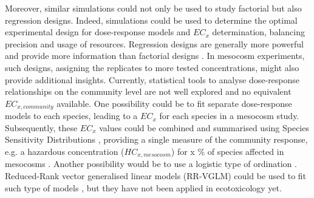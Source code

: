 Moreover, similar simulations could not only be used to study factorial but also regression designs.
Indeed, simulations could be used to determine the optimal experimental design for dose-response models and $EC_x$ determination, balancing precision and usage of resources. 
Regression designs are generally more powerful and provide more information than factorial designs  \citep{cottingham_knowing_2005}. 
In mesocosm experiments, such designs, assigning the replicates to more tested concentrations, might also provide additional insights.
Currently, statistical tools to analyse dose-response relationships on the community level are not well explored and no equivalent $EC_{x, community}$ available.
One possibility could be to fit separate dose-response models to each species, leading to a $EC_x$ for each species in a mesocosm study.
Subsequently, these $EC_x$ values could be combined and summarised using Species Sensitivity Distributions \citep{posthuma_species_2002}, providing a single measure of the community response, e.g. a hazardous concentration ($HC_{x, mesocosm}$) for x \% of species affected in mesocosms \citep{maltby_insecticide_2005}. 
Another possibility would be to use a logistic type of ordination \citep{van_den_brink_multivariate_2003}. 
Reduced-Rank vector generalised linear models (RR-VGLM) could be used to fit such type of models \citep{yee_reduced-rank_2003, yee_vector_2015}, but they have not been applied in ecotoxicology yet.

